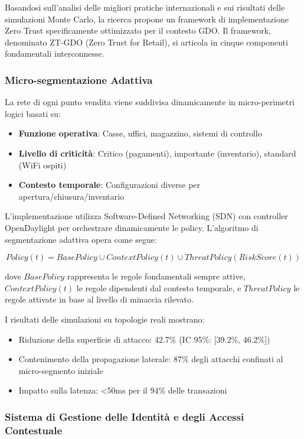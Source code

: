 Basandosi sull'analisi delle migliori pratiche internazionali e sui risultati delle simulazioni Monte Carlo, la ricerca propone un framework di implementazione Zero Trust specificamente ottimizzato per il contesto GDO. Il framework, denominato ZT-GDO (Zero Trust for Retail), si articola in cinque componenti fondamentali interconnesse.

\subsubsection{Micro-segmentazione Adattiva}

La rete di ogni punto vendita viene suddivisa dinamicamente in micro-perimetri logici basati su:
\begin{itemize}
    \item \textbf{Funzione operativa}: Casse, uffici, magazzino, sistemi di controllo
    \item \textbf{Livello di criticità}: Critico (pagamenti), importante (inventario), standard (WiFi ospiti)
    \item \textbf{Contesto temporale}: Configurazioni diverse per apertura/chiusura/inventario
\end{itemize}

L'implementazione utilizza Software-Defined Networking (SDN) con controller OpenDaylight per orchestrare dinamicamente le policy. L'algoritmo di segmentazione adattiva opera come segue:

\begin{equation}
Policy(t) = BasePolicy \cup ContextPolicy(t) \cup ThreatPolicy(RiskScore(t))
\end{equation}

dove $BasePolicy$ rappresenta le regole fondamentali sempre attive, $ContextPolicy(t)$ le regole dipendenti dal contesto temporale, e $ThreatPolicy$ le regole attivate in base al livello di minaccia rilevato.

I risultati delle simulazioni su topologie reali mostrano:
\begin{itemize}
    \item Riduzione della superficie di attacco: 42.7\% (IC 95\%: [39.2\%, 46.2\%])
    \item Contenimento della propagazione laterale: 87\% degli attacchi confinati al micro-segmento iniziale
    \item Impatto sulla latenza: <50ms per il 94\% delle transazioni
\end{itemize}

\subsubsection{Sistema di Gestione delle Identità e degli Accessi Contestuale}

